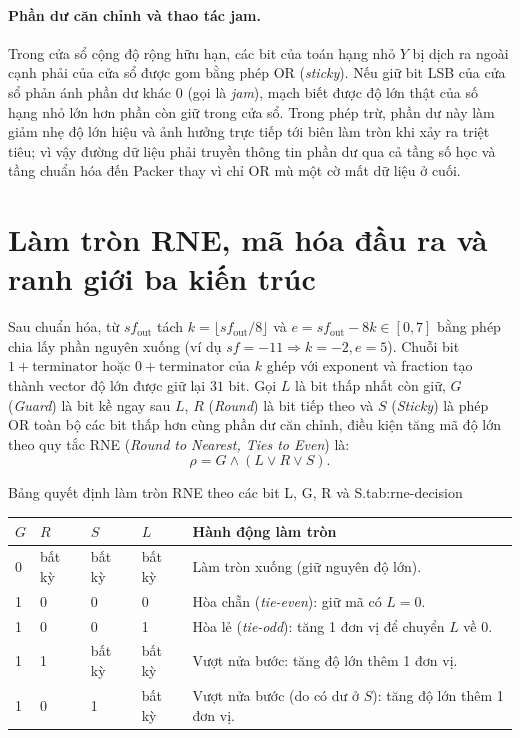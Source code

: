 \paragraph{Phần dư căn chỉnh và thao tác jam.}
Trong cửa sổ cộng độ rộng hữu hạn, các bit của toán hạng nhỏ $Y$ bị dịch ra ngoài
cạnh phải của cửa sổ được gom bằng phép OR (\textit{sticky}). Nếu giữ bit LSB
của cửa sổ phản ánh phần dư khác 0 (gọi là \textit{jam}), mạch biết được độ lớn
thật của số hạng nhỏ lớn hơn phần còn giữ trong cửa sổ. Trong phép trừ, phần dư
này làm giảm nhẹ độ lớn hiệu và ảnh hưởng trực tiếp tới biên làm tròn khi xảy ra
triệt tiêu; vì vậy đường dữ liệu phải truyền thông tin phần dư qua cả tầng số học
và tầng chuẩn hóa đến Packer thay vì chỉ OR mù một cờ mất dữ liệu ở cuối.

\section{Làm tròn RNE, mã hóa đầu ra và ranh giới ba kiến trúc}

Sau chuẩn hóa, từ $sf_{\mathrm{out}}$ tách $k = \lfloor sf_{\mathrm{out}} / 8 \rfloor$
và $e = sf_{\mathrm{out}} - 8k \in [0, 7]$ bằng phép chia lấy phần nguyên xuống
(ví dụ $sf = -11 \Rightarrow k = -2, e = 5$). Chuỗi bit $1+\text{terminator}$ hoặc
$0+\text{terminator}$ của $k$ ghép với exponent và fraction tạo thành vector độ
lớn được giữ lại $31$ bit. Gọi $L$ là bit thấp nhất còn giữ, $G$ (\textit{Guard})
là bit kề ngay sau $L$, $R$ (\textit{Round}) là bit tiếp theo và $S$ (\textit{Sticky})
là phép OR toàn bộ các bit thấp hơn cùng phần dư căn chỉnh, điều kiện tăng mã
độ lớn theo quy tắc RNE (\textit{Round to Nearest, Ties to Even}) là:
\[
\rho = G \land (L \lor R \lor S).
\]

\begin{engineeringtable}{Bảng quyết định làm tròn RNE theo các bit L, G, R và S.}{tab:rne-decision}
\begin{tabularx}{\linewidth}{@{}llllY@{}}
\toprule
$G$ & $R$ & $S$ & $L$ & Hành động làm tròn \\
 & bất kỳ & bất kỳ & bất kỳ & Làm tròn xuống (giữ nguyên độ lớn). \\
1 & 0 & 0 & 0 & Hòa chẵn (\textit{tie-even}): giữ mã có $L=0$. \\
1 & 0 & 0 & 1 & Hòa lẻ (\textit{tie-odd}): tăng 1 đơn vị để chuyển $L$ về $0$. \\
1 & 1 & bất kỳ & bất kỳ & Vượt nửa bước: tăng độ lớn thêm 1 đơn vị. \\
1 & 0 & 1 & bất kỳ & Vượt nửa bước (do có dư ở $S$): tăng độ lớn thêm 1 đơn vị. \\
\bottomrule
\end{tabularx}
\end{engineeringtable}

